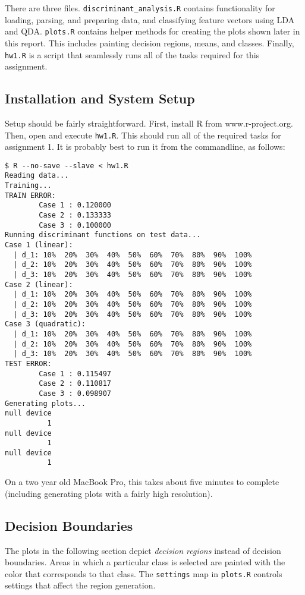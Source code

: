 \documentclass{article}
\begin{document}
There are three files. \verb|discriminant_analysis.R| contains functionality for loading,
parsing, and preparing data, and classifying feature vectors using LDA and QDA.
\verb|plots.R| contains helper methods for creating the plots shown later in this report.
This includes painting decision regions, means, and classes. Finally, \verb|hw1.R| is a
script that seamlessly runs all of the tasks required for this assignment.

\subsection{Installation and System Setup}

Setup should be fairly straightforward. First, install R from www.r-project.org. Then,
open and execute \verb|hw1.R|. This should run all of the required tasks for assignment
1. It is probably best to run it from the commandline, as follows:
\begin{verbatim}
$ R --no-save --slave < hw1.R
Reading data...
Training...
TRAIN ERROR:
        Case 1 : 0.120000
        Case 2 : 0.133333
        Case 3 : 0.100000
Running discriminant functions on test data...
Case 1 (linear):
  | d_1: 10%  20%  30%  40%  50%  60%  70%  80%  90%  100%
  | d_2: 10%  20%  30%  40%  50%  60%  70%  80%  90%  100%
  | d_3: 10%  20%  30%  40%  50%  60%  70%  80%  90%  100%
Case 2 (linear):
  | d_1: 10%  20%  30%  40%  50%  60%  70%  80%  90%  100%
  | d_2: 10%  20%  30%  40%  50%  60%  70%  80%  90%  100%
  | d_3: 10%  20%  30%  40%  50%  60%  70%  80%  90%  100%
Case 3 (quadratic):
  | d_1: 10%  20%  30%  40%  50%  60%  70%  80%  90%  100%
  | d_2: 10%  20%  30%  40%  50%  60%  70%  80%  90%  100%
  | d_3: 10%  20%  30%  40%  50%  60%  70%  80%  90%  100%
TEST ERROR:
        Case 1 : 0.115497
        Case 2 : 0.110817
        Case 3 : 0.098907
Generating plots...
null device
          1
null device
          1
null device
          1
\end{verbatim}
On a two year old MacBook Pro, this takes about five minutes to complete (including
generating plots with a fairly high resolution).

\subsection{Decision Boundaries}

The plots in the following section depict {\it decision regions} instead of
decision boundaries. Areas in which a particular class is selected are 
painted with the color that corresponds to that class. The \verb|settings|
map in \verb|plots.R| controls settings that affect the region generation.
\end{document}
